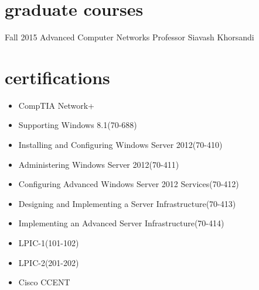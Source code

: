 \documentclass[]{friggeri-cv} %
\begin{document}

\section{graduate courses}

\begin{entrylist}

\entry
{Fall 2015}
{Advanced Computer Networks}
{Professor Siavash Khorsandi}
{}


\end{entrylist}


\section{certifications}
\begin{itemize}
	\item CompTIA Network+
	\item Supporting Windows 8.1(70-688)
	\item Installing and Configuring Windows Server 2012(70-410)
	\item Administering Windows Server 2012(70-411)
	\item Configuring Advanced Windows Server 2012 Services(70-412)
	\item Designing and Implementing a Server Infrastructure(70-413)
	\item Implementing an Advanced Server Infrastructure(70-414)
	\item LPIC-1(101-102)
	\item LPIC-2(201-202)
	\item Cisco CCENT
\end{itemize}


\end{document}
